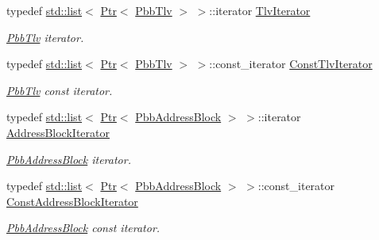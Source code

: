 \begin{DoxyCompactItemize}
\item 
typedef \hyperlink{openflow-interface_8h_afd9bcfa176617760671b67580f536fa7}{std\+::list}$<$ \hyperlink{classns3_1_1Ptr}{Ptr}$<$ \hyperlink{classns3_1_1PbbTlv}{Pbb\+Tlv} $>$ $>$\+::iterator \hyperlink{classns3_1_1PbbMessage_ac37cff092f8d01346e2d9498b4b34afd}{Tlv\+Iterator}
\begin{DoxyCompactList}\small\item\em \hyperlink{classns3_1_1PbbTlv}{Pbb\+Tlv} iterator. \end{DoxyCompactList}\item 
typedef \hyperlink{openflow-interface_8h_afd9bcfa176617760671b67580f536fa7}{std\+::list}$<$ \hyperlink{classns3_1_1Ptr}{Ptr}$<$ \hyperlink{classns3_1_1PbbTlv}{Pbb\+Tlv} $>$ $>$\+::const\+\_\+iterator \hyperlink{classns3_1_1PbbMessage_a61799e261fbd64220103731f0cc07594}{Const\+Tlv\+Iterator}
\begin{DoxyCompactList}\small\item\em \hyperlink{classns3_1_1PbbTlv}{Pbb\+Tlv} const iterator. \end{DoxyCompactList}\item 
typedef \hyperlink{openflow-interface_8h_afd9bcfa176617760671b67580f536fa7}{std\+::list}$<$ \hyperlink{classns3_1_1Ptr}{Ptr}$<$ \hyperlink{classns3_1_1PbbAddressBlock}{Pbb\+Address\+Block} $>$ $>$\+::iterator \hyperlink{classns3_1_1PbbMessage_a9ab666cb1f964e91878353ded8a8f303}{Address\+Block\+Iterator}
\begin{DoxyCompactList}\small\item\em \hyperlink{classns3_1_1PbbAddressBlock}{Pbb\+Address\+Block} iterator. \end{DoxyCompactList}\item 
typedef \hyperlink{openflow-interface_8h_afd9bcfa176617760671b67580f536fa7}{std\+::list}$<$ \hyperlink{classns3_1_1Ptr}{Ptr}$<$ \hyperlink{classns3_1_1PbbAddressBlock}{Pbb\+Address\+Block} $>$ $>$\+::const\+\_\+iterator \hyperlink{classns3_1_1PbbMessage_ac6e5429e1135918dd1791a4b92a09a56}{Const\+Address\+Block\+Iterator}
\begin{DoxyCompactList}\small\item\em \hyperlink{classns3_1_1PbbAddressBlock}{Pbb\+Address\+Block} const iterator. \end{DoxyCompactList}\end{DoxyCompactItemize}
